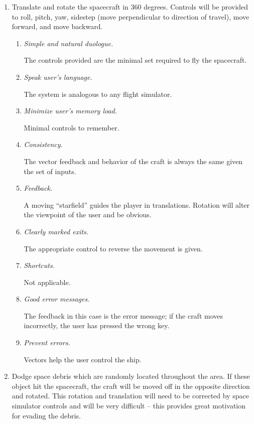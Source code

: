 \begin{enumerate}

  \item Translate and rotate the spacecraft in 360 degrees.  Controls will be provided to roll, pitch, yaw, sidestep (move perpendicular to direction of travel), move forward, and move backward.
\begin{enumerate}
  
  \item \emph{Simple and natural duologue.}

  The controls provided are the minimal set required to fly the spacecraft.
  
  \item \emph{Speak user's language.}

  The system is analogous to any flight simulator.
  
  \item \emph{Minimize user's memory load.}

  Minimal controls to remember.
  
  \item \emph{Consistency.}

  The vector feedback and behavior of the craft is always the same given the set of inputs.
  
  \item \emph{Feedback.}

  A moving ``starfield'' guides the player in translations.  Rotation will alter the viewpoint of the user and be obvious.
  
  \item \emph{Clearly marked exits.}

  The appropriate control to reverse the movement is given.
  
  \item \emph{Shortcuts.}

  Not applicable.
  
  \item \emph{Good error messages.}
  
  The feedback in this case is the error message; if the craft moves incorrectly, the user has pressed the wrong key.

  \item \emph{Prevent errors.}

  Vectors help the user control the ship.
 
\end{enumerate}

  \item Dodge space debris which are randomly located throughout the area.  If these object hit the spacecraft, the craft will be moved off in the opposite direction and rotated.  This rotation and translation will need to be corrected by space simulator controls and will be very difficult -- this provides great motivation for evading the debris.
\begin{enumerate}
  

\end{enumerate}
\end{enumerate}
